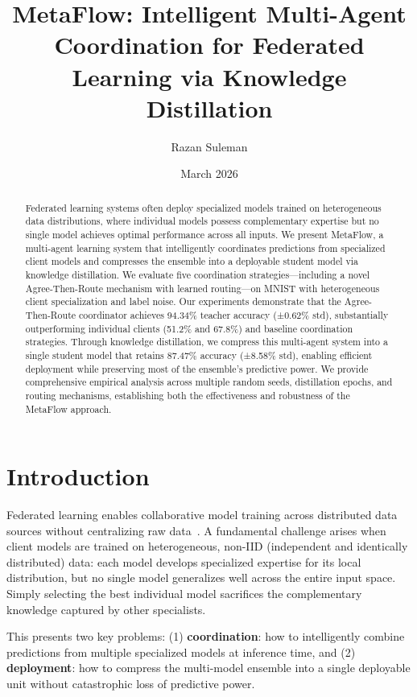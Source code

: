 \documentclass[12pt]{article}
\title{MetaFlow: Intelligent Multi-Agent Coordination for Federated Learning via Knowledge Distillation}
\author{Razan Suleman}
\date{March 2026}
\begin{document}
\maketitle

\begin{abstract}
Federated learning systems often deploy specialized models trained on heterogeneous data distributions, where individual models possess complementary expertise but no single model achieves optimal performance across all inputs. We present MetaFlow, a multi-agent learning system that intelligently coordinates predictions from specialized client models and compresses the ensemble into a deployable student model via knowledge distillation. We evaluate five coordination strategies—including a novel Agree-Then-Route mechanism with learned routing—on MNIST with heterogeneous client specialization and label noise. Our experiments demonstrate that the Agree-Then-Route coordinator achieves 94.34\% teacher accuracy (±0.62\% std), substantially outperforming individual clients (51.2\% and 67.8\%) and baseline coordination strategies. Through knowledge distillation, we compress this multi-agent system into a single student model that retains 87.47\% accuracy (±8.58\% std), enabling efficient deployment while preserving most of the ensemble's predictive power. We provide comprehensive empirical analysis across multiple random seeds, distillation epochs, and routing mechanisms, establishing both the effectiveness and robustness of the MetaFlow approach.
\end{abstract}

\section{Introduction}
\label{sec:introduction}

Federated learning enables collaborative model training across distributed data sources without centralizing raw data~\cite{mcmahan2017communication}. A fundamental challenge arises when client models are trained on heterogeneous, non-IID (independent and identically distributed) data: each model develops specialized expertise for its local distribution, but no single model generalizes well across the entire input space. Simply selecting the best individual model sacrifices the complementary knowledge captured by other specialists.

This presents two key problems: (1) \textbf{coordination}: how to intelligently combine predictions from multiple specialized models at inference time, and (2) \textbf{deployment}: how to compress the multi-model ensemble into a single deployable unit without catastrophic loss of predictive power.
\end{document}
